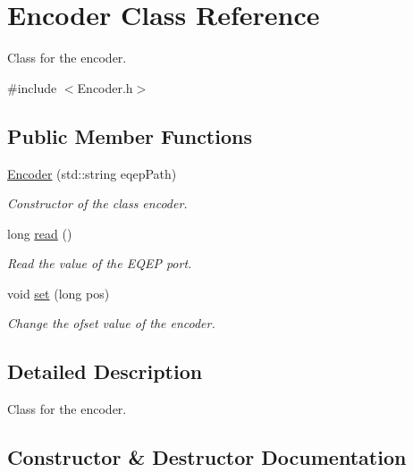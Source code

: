 \hypertarget{class_encoder}{}\section{Encoder Class Reference}
\label{class_encoder}


Class for the encoder.  




{\ttfamily \#include $<$Encoder.\+h$>$}

\subsection*{Public Member Functions}
\begin{DoxyCompactItemize}
\item 
\mbox{\hyperlink{class_encoder_aead4c70db553fd8f649de7d80906fd1b}{Encoder}} (std\+::string eqep\+Path)
\begin{DoxyCompactList}\small\item\em Constructor of the class encoder. \end{DoxyCompactList}\item 
long \mbox{\hyperlink{class_encoder_a6a2a38a6af043ab097f50036f5d0c9c6}{read}} ()
\begin{DoxyCompactList}\small\item\em Read the value of the E\+Q\+EP port. \end{DoxyCompactList}\item 
void \mbox{\hyperlink{class_encoder_a52357dc803ed8c469228a5c71f2dbe20}{set}} (long pos)
\begin{DoxyCompactList}\small\item\em Change the ofset value of the encoder. \end{DoxyCompactList}\end{DoxyCompactItemize}


\subsection{Detailed Description}
Class for the encoder. 

\subsection{Constructor \& Destructor Documentation}
\mbox{\label{class_encoder_aead4c70db553fd8f649de7d80906fd1b}} 
